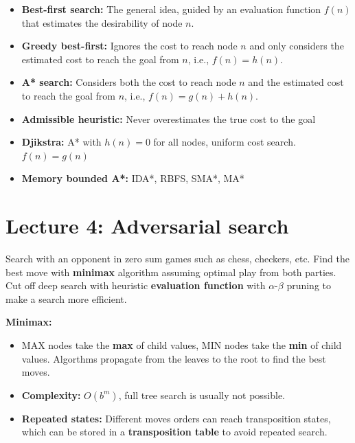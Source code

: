 \documentclass[12pt,a4paper]{article}
\begin{document}
\begin{itemize}
    \item \textbf{Best-first search:} The general idea, guided by an evaluation function $f(n)$ that estimates the desirability of node $n$.
    \item \textbf{Greedy best-first:} Ignores the cost to reach node $n$ and only considers the estimated cost to reach the goal from $n$, i.e., $f(n) = h(n)$.
    \item \textbf{A* search:} Considers both the cost to reach node $n$ and the estimated cost to reach the goal from $n$, i.e., $f(n) = g(n) + h(n)$.
    \item \textbf{Admissible heuristic:} Never overestimates the true cost to the goal
    \item \textbf{Djikstra:} A* with $h(n) = 0$ for all nodes, uniform cost search. $f(n) = g(n)$
    \item \textbf{Memory bounded A*:} IDA*, RBFS, SMA*, MA*
\end{itemize}

\section{Lecture 4: Adversarial search}
Search with an opponent in zero sum games such as chess, checkers, etc. Find the best move with \textbf{minimax} algorithm assuming optimal play from both parties. Cut off deep search with heuristic \textbf{evaluation function} with $\alpha$-$\beta$ pruning to make a search more efficient.

\vspace{10pt}
\textbf{Minimax:}
\begin{itemize}
    \item MAX nodes take the \textbf{max} of child values, MIN nodes take the \textbf{min} of child values. Algorthms propagate from the leaves to the root to find the best moves.
    \item \textbf{Complexity:} $O(b^{m})$, full tree search is usually not possible.
    \item \textbf{Repeated states:} Different moves orders can reach transposition states, which can be stored in a \textbf{transposition table} to avoid repeated search.
\end{itemize}
\end{document}
